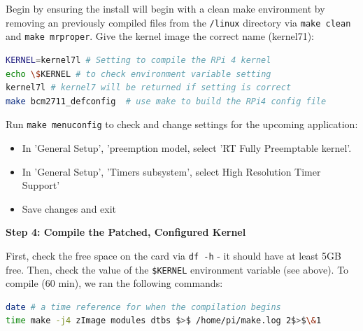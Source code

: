 \documentclass[a4paper,10pt]{article}
\newcommand{\code}[1]{\colorbox{light-gray}{\texttt{#1}}}
\begin{document}
Begin by ensuring the install will begin with a clean make environment by removing an previously compiled files from the \code{/linux} directory via \code{make clean} and \code{make mrproper}. Give the kernel image the correct name (kernel71):
\begin{center}
\begin{lstlisting}[language=bash, label=code:code11] 
KERNEL=kernel7l # Setting to compile the RPi 4 kernel
echo \$KERNEL # to check environment variable setting
kernel7l # kernel7 will be returned if setting is correct
make bcm2711_defconfig  # use make to build the RPi4 config file
\end{lstlisting}
\end{center}\vspace{-1em}




Run \code{make menuconfig} to check and change settings for the upcoming application: 

\begin{itemize}
    \item In 'General Setup', 'preemption model, select 'RT Fully Preemptable kernel'. 
    \item In 'General Setup', 'Timers subsystem', select High Resolution Timer Support'
    \item Save changes and exit
\end{itemize}

\textbf{Step 4: Compile the Patched, Configured Kernel}

First, check the free space on the card via \code{df -h} - it should have at least 5GB free. Then, check the value of the \code{\$KERNEL} environment variable (see above). To compile (60 min), we ran the following commands:
\begin{center}
\begin{lstlisting}[language=bash, label=code:code12] 
date # a time reference for when the compilation begins
time make -j4 zImage modules dtbs $>$ /home/pi/make.log 2$>$\&1
\end{lstlisting}
\end{center}\vspace{-1em}
\end{document}
